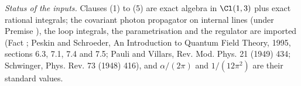 \emph{Status of the inputs.} Clauses (1) to (5) are exact algebra in $\Cl(1,3)$ plus exact rational integrals; the covariant photon propagator on internal lines (under Premise ), the loop integrals, the parametrisation and the regulator are imported (Fact ; Peskin and Schroeder, An Introduction to Quantum Field Theory, 1995, sections 6.3, 7.1, 7.4 and 7.5; Pauli and Villars, Rev. Mod. Phys. 21 (1949) 434; Schwinger, Phys. Rev. 73 (1948) 416), and $\alpha/(2\pi)$ and $1/(12\pi^{2})$ are their standard values.
